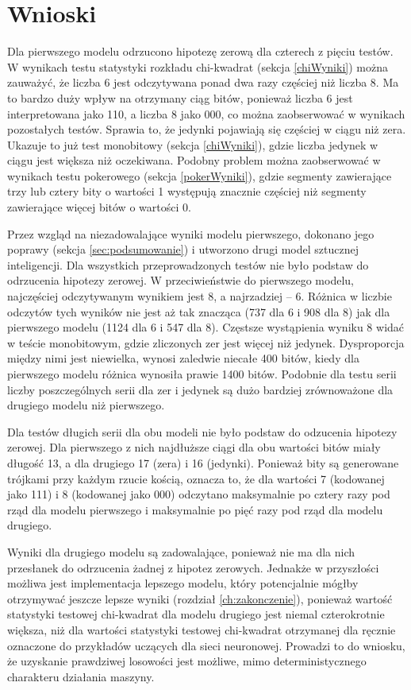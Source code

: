 \section{Wnioski}
Dla pierwszego modelu odrzucono hipotezę zerową dla czterech z pięciu testów. W wynikach testu statystyki 
rozkładu chi-kwadrat (sekcja \ref{chiWyniki}) można zauważyć, że liczba 6 jest odczytywana ponad dwa razy częściej niż 
liczba 8. Ma to bardzo duży wpływ na otrzymany ciąg bitów, ponieważ liczba 6 jest interpretowana jako 110, a 
liczba 8 jako 000, co można zaobserwować w wynikach pozostałych testów. Sprawia to, że jedynki pojawiają się 
częściej w ciągu niż zera. Ukazuje to już test monobitowy (sekcja \ref{chiWyniki}), gdzie liczba jedynek w ciągu jest 
większa niż oczekiwana. Podobny problem można zaobserwować w wynikach testu pokerowego (sekcja \ref{pokerWyniki}), 
gdzie segmenty zawierające trzy lub cztery bity o wartości 1 występują znacznie częściej niż segmenty zawierające 
więcej bitów o wartości 0. 

Przez wzgląd na niezadowalające wyniki modelu pierwszego, dokonano jego poprawy (sekcja \ref{sec:podsumowanie}) i
utworzono drugi model sztucznej inteligencji. Dla wszystkich przeprowadzonych testów nie było podstaw do odrzucenia
hipotezy zerowej. W przeciwieństwie do pierwszego modelu, najczęściej odczytywanym wynikiem jest 8, a najrzadziej -- 6.
Różnica w liczbie odczytów tych wyników nie jest aż tak znacząca (737 dla 6 i 908 dla 8) jak dla pierwszego modelu 
(1124 dla 6 i 547 dla 8). Częstsze wystąpienia wyniku 8 widać w teście monobitowym, gdzie zliczonych zer jest więcej
niż jedynek. Dysproporcja między nimi jest niewielka, wynosi zaledwie niecałe 400 bitów, kiedy dla pierwszego modelu
różnica wynosiła prawie 1400 bitów. Podobnie dla testu serii liczby poszczególnych serii dla zer i jedynek są dużo
bardziej zrównoważone dla drugiego modelu niż pierwszego. 

Dla testów długich serii dla obu modeli nie było podstaw do odzucenia hipotezy zerowej. Dla pierwszego z nich najdłuższe
ciągi dla obu wartości bitów miały długość 13, a dla drugiego 17 (zera) i 16 (jedynki). Ponieważ bity są generowane 
trójkami przy każdym rzucie kością, oznacza to, że dla wartości 7 (kodowanej jako 111) i 8 (kodowanej jako 000)
odczytano maksymalnie po cztery razy pod rząd dla modelu pierwszego i maksymalnie po pięć razy pod rząd dla modelu 
drugiego. 

Wyniki dla drugiego modelu są zadowalające, ponieważ nie ma dla nich przesłanek do odrzucenia żadnej z hipotez zerowych.
Jednakże w przyszłości możliwa jest implementacja lepszego modelu, który
potencjalnie mógłby otrzymywać jeszcze lepsze wyniki (rozdział \ref{ch:zakonczenie}), ponieważ wartość statystyki testowej
chi-kwadrat dla modelu drugiego jest niemal czterokrotnie większa, niż dla wartości statystyki testowej chi-kwadrat 
otrzymanej dla ręcznie oznaczone do przykładów uczących dla sieci neuronowej.
Prowadzi to do wniosku, że uzyskanie prawdziwej losowości jest możliwe, mimo deterministycznego charakteru działania maszyny.
